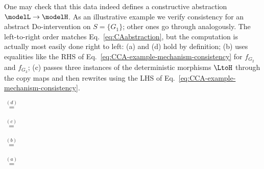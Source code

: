 \documentclass{article}
\begin{document}
\begin{example}
	 One may check that this data indeed defines a constructive abstraction $\modelL \rightarrow \modelH$. 
	 As an illustrative example we verify consistency for an abstract Do-intervention on $S=\{G_1\}$; other ones go through analogously. 
	 The left-to-right order matches Eq.~\eqref{eq:CAabstraction}, but the computation is actually most easily done right to left: (a) and (d) hold by definition; (b) uses equalities like the RHS of Eq.~\eqref{eq:CCA-example-mechanism-consistency} for $f_{G_2}$ and $f_{G_3}$; (c) passes three instances of the deterministic morphisms $\LtoH$ through the copy maps 
	  and then rewrites using the LHS of Eq.~\eqref{eq:CCA-example-mechanism-consistency}. 
	\begin{center}
		\begin{minipage}{0.2\textwidth}
			\centering
		\end{minipage}
		\hspace*{0.5cm} $\stackrel{(d)}{=}$ \hspace*{0.5cm}
		\begin{minipage}{0.4\textwidth}
			\centering
		\end{minipage} 
		\hspace*{1.0cm}
		$\stackrel{(c)}{=}$ \\
		\begin{minipage}{0.41\textwidth}
			\centering
			\hspace*{-0.6cm}
		\end{minipage} 
		$\stackrel{(b)}{=}$
		\begin{minipage}{0.3\textwidth}
			\centering
			\vspace*{0.5cm}
			\hspace*{-0.6cm}
		\end{minipage}
		$\stackrel{(a)}{=}$
		\begin{minipage}{0.21\textwidth}
			\centering
		\end{minipage}  
	\end{center} 
	\color{black}
\end{example}


\subsection{\restrictedCCAcaps} \label{subsec:weak-CA}
\end{document}
